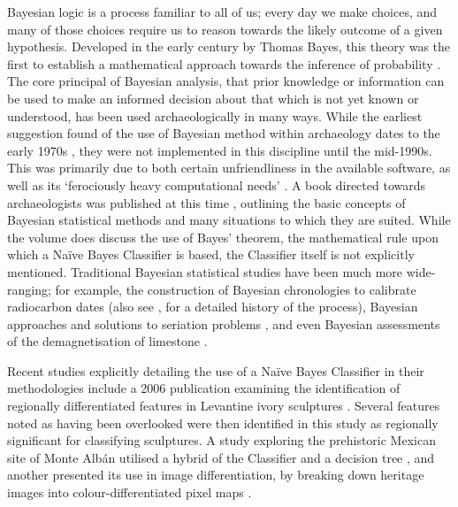 	Bayesian logic is a process familiar to all of us; every day we make choices, and many of those choices require us to reason towards the likely outcome of a given hypothesis. Developed in the early  century by Thomas Bayes, this theory was the first to establish a mathematical approach towards the inference of probability \parencite[2]{Delampady_2003}. The core principal of Bayesian analysis, that prior knowledge or information can be used to make an informed decision about that which is not yet known or understood, has been used archaeologically in many ways. While the earliest suggestion found of the use of Bayesian method within archaeology dates to the early 1970s \parencite[446]{Doran_1972}, they were not implemented in this discipline until the mid-1990s. This was primarily due to both certain unfriendliness in the available software, as well as its ‘ferociously heavy computational needs’ \parencite[139]{Orton_1992}. A book directed towards archaeologists was published at this time \parencite{Buck_1996}, outlining the basic concepts of Bayesian statistical methods and many situations to which they are suited. While the \textcite{Buck_1996} volume does discuss the use of Bayes’ theorem, the mathematical rule upon which a Naïve Bayes Classifier is based, the Classifier itself is not explicitly mentioned. Traditional Bayesian statistical studies have been much more wide-ranging; for example, the construction of Bayesian chronologies to calibrate radiocarbon dates \parencites{Bayliss_2007}{Levy_2010}(also see \textcite{Bayliss_2009}, for a detailed history of the process), Bayesian approaches and solutions to seriation problems \parencite{Halekoh_2004}, and even Bayesian assessments of the demagnetisation of limestone \parencite{Borradaile_2003}.
	
	Recent studies explicitly detailing the use of a Naïve Bayes Classifier in their methodologies include a 2006 publication examining the identification of regionally differentiated features in Levantine ivory sculptures \parencite{Gansell_2006}. Several features noted as having been overlooked were then identified in this study as regionally significant for classifying sculptures. A study exploring the prehistoric Mexican site of Monte Albán utilised a hybrid of the Classifier and a decision tree \parencite{Reynolds_2008}, and another presented its use in image differentiation, by breaking down heritage images into colour-differentiated pixel maps \parencite{Polpinij_2010}.
	
